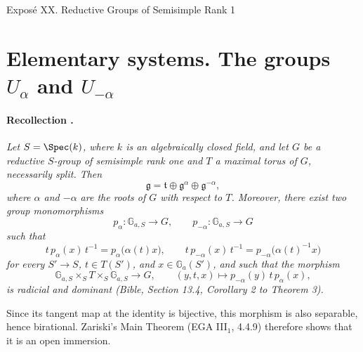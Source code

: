 
  {Exposé XX. Reductive Groups of Semisimple Rank 1}


\setcounter{footnote}{0}

\section{Elementary systems. The groups \(U_\alpha\) and \(U_{-\alpha}\)}

\paragraph{\textbf{Recollection .}}
\emph{Let \(S=\Spec(k)\), where \(k\) is an algebraically closed
field, and let \(G\) be a reductive \(S\)-group of semisimple rank
one and \(T\) a maximal torus of \(G\), necessarily split. Then}
\[
  \mathfrak g=\mathfrak t\oplus\mathfrak g^\alpha
  \oplus\mathfrak g^{-\alpha},
\]
\emph{where \(\alpha\) and \(-\alpha\) are the roots of \(G\) with
respect to \(T\). Moreover, there exist two group monomorphisms}
\[
  p_\alpha\colon\mathbb G_{a,S}\longrightarrow G,
  \qquad
  p_{-\alpha}\colon\mathbb G_{a,S}\longrightarrow G
\]
\emph{such that}
\[
  t\,p_\alpha(x)\,t^{-1}=p_\alpha\bigl(\alpha(t)x\bigr),
  \qquad
  t\,p_{-\alpha}(x)\,t^{-1}
    =p_{-\alpha}\bigl(\alpha(t)^{-1}x\bigr)
\]
\emph{for every \(S'\to S\), \(t\in T(S')\), and
\(x\in\mathbb G_a(S')\), and such that the morphism}
\[
  \mathbb G_{a,S}\times_S T\times_S\mathbb G_{a,S}
    \longrightarrow G,
  \qquad
  (y,t,x)\longmapsto p_{-\alpha}(y)\,t\,p_\alpha(x),
\]
\emph{is radicial and dominant \textup{(\emph{Bible}, Section 13.4,
Corollary 2 to Theorem 3)}.}

Since its tangent map at the identity is bijective, this morphism is
also separable, hence birational. Zariski's Main Theorem
\textup{(EGA III\(_1\), 4.4.9)} therefore shows that it is an open
immersion.

